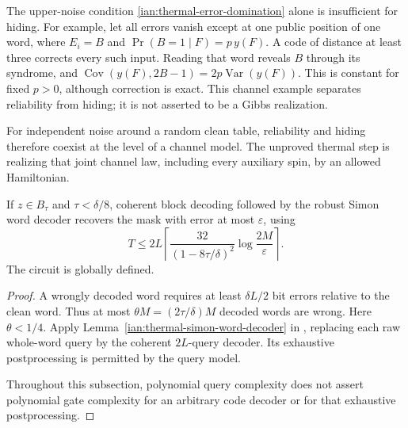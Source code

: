 \begin{remark}
\label{ian:thermal-coded-channel-leakage}
The upper-noise condition
\eqref{ian:thermal-error-domination} alone is insufficient for
hiding. For example, let all errors vanish except at one public
position of one word, where \(E_i=B\) and
\(\Pr(B=1\mid F)=p\,y(F)\). A code of distance at least three
corrects every such input. Reading that word reveals \(B\) through
its syndrome, and
\(\operatorname{Cov}(y(F),2B-1)=2p\operatorname{Var}(y(F))\).
This is constant for fixed \(p>0\), although correction is exact.
This channel example separates reliability from hiding; it is not
asserted to be a Gibbs realization.

For independent noise around a random clean table, reliability and
hiding therefore coexist at the level of a channel model. The
unproved thermal step is realizing that joint channel law, including
every auxiliary spin, by an allowed Hamiltonian.
\end{remark}

\begin{lemma}
\label{ian:thermal-global-bit-decoder}
If \(z\in B_\tau\) and \(\tau<\delta/8\), coherent block decoding
followed by the robust Simon word decoder recovers the mask with
error at most \(\varepsilon\), using
\[
 T\le
 2L\left\lceil
 \frac{32}{(1-8\tau/\delta)^2}
       \log\frac{2M}{\varepsilon}
 \right\rceil .
 \tag{38.18}
\]
The circuit is globally defined.
\end{lemma}

\begin{proof}
A wrongly decoded word requires at least \(\delta L/2\) bit errors
relative to the clean word. Thus at most
\(\theta M=(2\tau/\delta)M\) decoded words are wrong.
Here \(\theta<1/4\).
Apply Lemma~\ref{ian:thermal-simon-word-decoder} in
, replacing each raw whole-word
query by the coherent \(2L\)-query decoder.
Its exhaustive postprocessing is permitted by the query model.

Throughout this subsection, polynomial query complexity does not
assert polynomial gate complexity for an arbitrary code decoder or
for that exhaustive postprocessing.
\end{proof}

